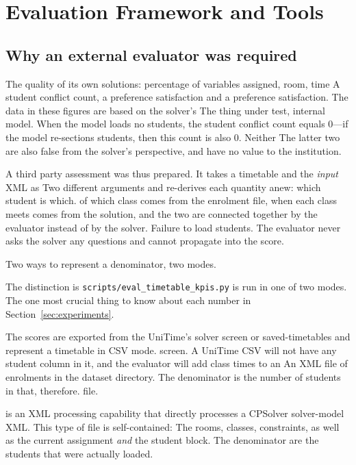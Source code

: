 \section{Evaluation Framework and Tools}
\label{sec:evaluation}

\subsection{Why an external evaluator was required}

The quality of its own solutions: percentage of variables assigned, room, time
A student conflict count, a preference satisfaction and a preference satisfaction. The data in these figures are based on the solver's
The thing under test, internal model. When the model loads no students, the student
conflict count equals 0---if the model re-sections students, then this count is also 0. Neither
The latter two are also false from the solver's perspective, and have no value to the institution.

A third party assessment was thus prepared. It takes a timetable and the \emph{input} XML as
Two different arguments and re-derives each quantity anew: which student is which.
of which class comes from the enrolment file, when each class meets comes from the solution, and the
two are connected together by the evaluator instead of by the solver. Failure to load students.
The evaluator never asks the solver any questions and cannot propagate into the score.

Two ways to represent a denominator, two modes.

The distinction is \texttt{scripts/eval\_timetable\_kpis.py} is run in one of two modes.
The one most crucial thing to know about each number in Section~\ref{sec:experiments}.

\begin{description}[leftmargin=1.6em,style=nextline]
  \item[CSV mode]   The scores are exported from the UniTime's solver screen or saved-timetables and represent a timetable in CSV mode.
  screen. A UniTime CSV will not have any student column in it, and the evaluator will add class times to an
  An XML file of enrolments in the dataset directory. The denominator is the number of students in that, therefore.
  file.
\item[XML mode] is an XML processing capability that directly processes a CPSolver solver-model XML. This type of file is self-contained:
The rooms, classes, constraints, as well as the current assignment \emph{and} the student block.
The denominator are the students that were actually loaded.
\end{description}


